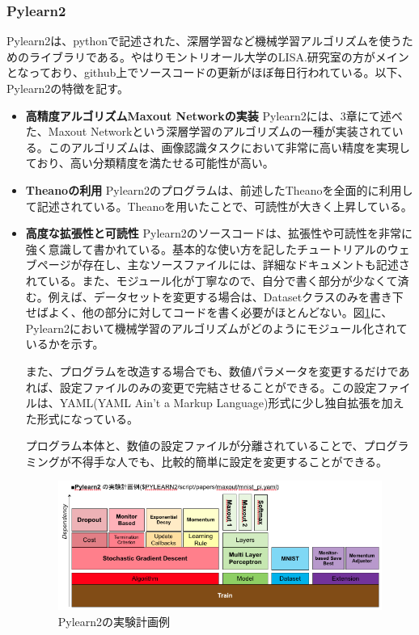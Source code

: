 \subsubsection{Pylearn2}
Pylearn2は、pythonで記述された、深層学習など機械学習アルゴリズムを使うためのライブラリである\cite{goodfellow2013Pylearn2:}。やはりモントリオール大学のLISA.研究室の方がメインとなっており、github上でソースコードの更新がほぼ毎日行われている。以下、Pylearn2の特徴を記す。
\begin{itemize}
\item \textbf{高精度アルゴリズムMaxout Networkの実装}
Pylearn2には、3章にて述べた、Maxout Networkという深層学習のアルゴリズムの一種が実装されている。このアルゴリズムは、画像認識タスクにおいて非常に高い精度を実現しており、高い分類精度を満たせる可能性が高い。
\item \textbf{Theanoの利用}
Pylearn2のプログラムは、前述したTheanoを全面的に利用して記述されている。Theanoを用いたことで、可読性が大きく上昇している。
\item \textbf{高度な拡張性と可読性}
Pylearn2のソースコードは、拡張性や可読性を非常に強く意識して書かれている。基本的な使い方を記したチュートリアルのウェブページが存在し、主なソースファイルには、詳細なドキュメントも記述されている。また、モジュール化が丁寧なので、自分で書く部分が少なくて済む。例えば、データセットを変更する場合は、Datasetクラスのみを書き下せばよく、他の部分に対してコードを書く必要がほとんどない。図\ref{c4_Pylearn2_yaml}に、Pylearn2において機械学習のアルゴリズムがどのようにモジュール化されているかを示す。\par
また、プログラムを改造する場合でも、数値パラメータを変更するだけであれば、設定ファイルのみの変更で完結させることができる。この設定ファイルは、YAML(YAML Ain't a Markup Language)形式に少し独自拡張を加えた形式になっている。\par
プログラム本体と、数値の設定ファイルが分離されていることで、プログラミングが不得手な人でも、比較的簡単に設定を変更することができる。\par
\begin{figure}[tbp]
 \begin{center}
  \includegraphics[width=120mm]{img/c4/Pylearn2_yaml}
 \end{center}
 \caption{Pylearn2の実験計画例}
 \label{c4_Pylearn2_yaml}
\end{figure}
\end{itemize}

